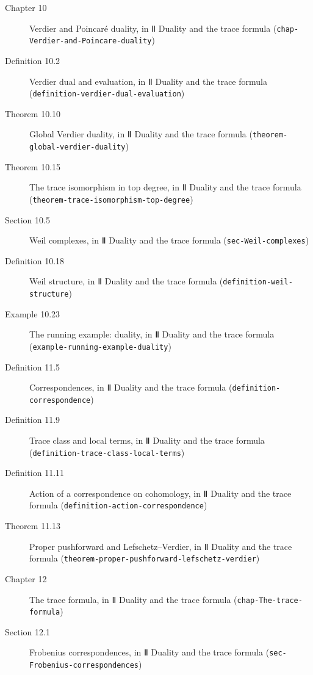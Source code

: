 \documentclass[11pt]{article}
\newcommand{\bpslug}[1]{\texttt{#1}}
\begin{document}
\begin{description}
\item[Chapter 10] Verdier and Poincaré duality, in Ⅱ Duality and the trace formula (\bpslug{chap-{}\allowbreak{}Verdier-{}\allowbreak{}and-{}\allowbreak{}Poincare-{}\allowbreak{}duality})
\item[Definition 10.2] Verdier dual and evaluation, in Ⅱ Duality and the trace formula (\bpslug{definition-{}\allowbreak{}verdier-{}\allowbreak{}dual-{}\allowbreak{}evaluation})
\item[Theorem 10.10] Global Verdier duality, in Ⅱ Duality and the trace formula (\bpslug{theorem-{}\allowbreak{}global-{}\allowbreak{}verdier-{}\allowbreak{}duality})
\item[Theorem 10.15] The trace isomorphism in top degree, in Ⅱ Duality and the trace formula (\bpslug{theorem-{}\allowbreak{}trace-{}\allowbreak{}isomorphism-{}\allowbreak{}top-{}\allowbreak{}degree})
\item[Section 10.5] Weil complexes, in Ⅱ Duality and the trace formula (\bpslug{sec-{}\allowbreak{}Weil-{}\allowbreak{}complexes})
\item[Definition 10.18] Weil structure, in Ⅱ Duality and the trace formula (\bpslug{definition-{}\allowbreak{}weil-{}\allowbreak{}structure})
\item[Example 10.23] The running example: duality, in Ⅱ Duality and the trace formula (\bpslug{example-{}\allowbreak{}running-{}\allowbreak{}example-{}\allowbreak{}duality})
\item[Definition 11.5] Correspondences, in Ⅱ Duality and the trace formula (\bpslug{definition-{}\allowbreak{}correspondence})
\item[Definition 11.9] Trace class and local terms, in Ⅱ Duality and the trace formula (\bpslug{definition-{}\allowbreak{}trace-{}\allowbreak{}class-{}\allowbreak{}local-{}\allowbreak{}terms})
\item[Definition 11.11] Action of a correspondence on cohomology, in Ⅱ Duality and the trace formula (\bpslug{definition-{}\allowbreak{}action-{}\allowbreak{}correspondence})
\item[Theorem 11.13] Proper pushforward and Lefschetz–Verdier, in Ⅱ Duality and the trace formula (\bpslug{theorem-{}\allowbreak{}proper-{}\allowbreak{}pushforward-{}\allowbreak{}lefschetz-{}\allowbreak{}verdier})
\item[Chapter 12] The trace formula, in Ⅱ Duality and the trace formula (\bpslug{chap-{}\allowbreak{}The-{}\allowbreak{}trace-{}\allowbreak{}formula})
\item[Section 12.1] Frobenius correspondences, in Ⅱ Duality and the trace formula (\bpslug{sec-{}\allowbreak{}Frobenius-{}\allowbreak{}correspondences})

\end{description}
\end{document}
